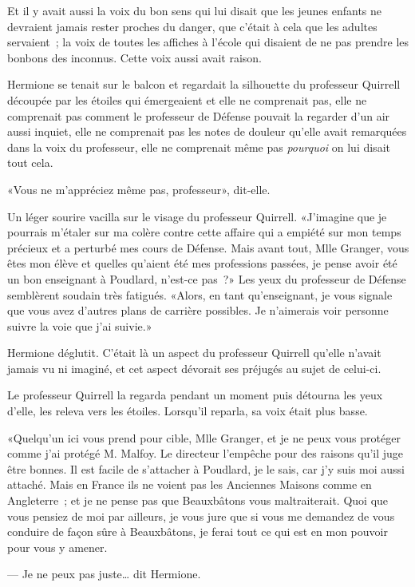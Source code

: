 Et il y avait aussi la voix du bon sens qui lui disait que les jeunes enfants ne devraient jamais rester proches du danger, que c'était à cela que les adultes servaient~; la voix de toutes les affiches à l'école qui disaient de ne pas prendre les bonbons des inconnus. Cette voix aussi avait raison.

Hermione se tenait sur le balcon et regardait la silhouette du professeur Quirrell découpée par les étoiles qui émergeaient et elle ne comprenait pas, elle ne comprenait pas comment le professeur de Défense pouvait la regarder d'un air aussi inquiet, elle ne comprenait pas les notes de douleur qu'elle avait remarquées dans la voix du professeur, elle ne comprenait même pas \emph{pourquoi} on lui disait tout cela.

«Vous ne m'appréciez même pas, professeur», dit-elle.

Un léger sourire vacilla sur le visage du professeur Quirrell. «J'imagine que je pourrais m'étaler sur ma colère contre cette affaire qui a empiété sur mon temps précieux et a perturbé mes cours de Défense. Mais avant tout, Mlle Granger, vous êtes mon élève et quelles qu'aient été mes professions passées, je pense avoir été un bon enseignant à Poudlard, n'est-ce pas~?» Les yeux du professeur de Défense semblèrent soudain très fatigués. «Alors, en tant qu'enseignant, je vous signale que vous avez d'autres plans de carrière possibles. Je n'aimerais voir personne suivre la voie que j'ai suivie.»

Hermione déglutit. C'était là un aspect du professeur Quirrell qu'elle n'avait jamais vu ni imaginé, et cet aspect dévorait ses préjugés au sujet de celui-ci.

Le professeur Quirrell la regarda pendant un moment puis détourna les yeux d'elle, les releva vers les étoiles. Lorsqu'il reparla, sa voix était plus basse.

«Quelqu'un ici vous prend pour cible, Mlle Granger, et je ne peux vous protéger comme j'ai protégé M. Malfoy. Le directeur l'empêche pour des raisons qu'il juge être bonnes. Il est facile de s'attacher à Poudlard, je le sais, car j'y suis moi aussi attaché. Mais en France ils ne voient pas les Anciennes Maisons comme en Angleterre~; et je ne pense pas que Beauxbâtons vous maltraiterait. Quoi que vous pensiez de moi par ailleurs, je vous jure que si vous me demandez de vous conduire de façon sûre à Beauxbâtons, je ferai tout ce qui est en mon pouvoir pour vous y amener.

--- Je ne peux pas juste… dit Hermione.

